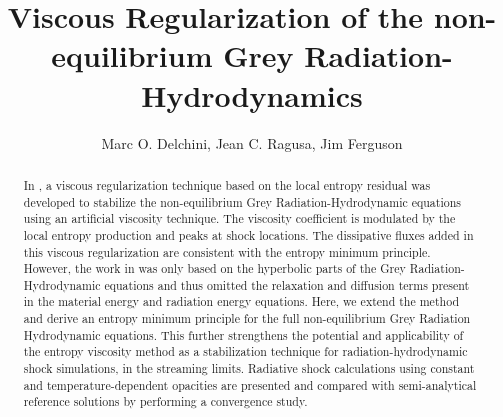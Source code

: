 \documentclass[times,doublespace]{fldauth}%
\begin{document}
%


\title{Viscous Regularization of the non-equilibrium Grey Radiation-Hydrodynamics}

\author{Marc O. Delchini, Jean C. Ragusa\corrauth{}, Jim Ferguson}

\address{
{Department of Nuclear Engineering, Texas A\&M University, College Station, TX 77843, USA} \\
{Los Alamos National Laboratory, Los Alamos, NM 77843, USA}
}


\begin{abstract}
In \cite{our_jcp_radhy_paper}, a viscous regularization technique based on the local entropy residual was
developed to stabilize the non-equilibrium Grey Radiation-Hydrodynamic equations using an artificial viscosity technique. 
The viscosity coefficient is modulated by the local entropy production and peaks at shock locations. 
The dissipative fluxes added in this viscous regularization are consistent with the entropy minimum principle. 
However, the work in \cite{our_jcp_radhy_paper} was only based on the hyperbolic parts
of the Grey Radiation-Hydrodynamic equations and thus omitted the relaxation and diffusion terms 
present in the material energy and radiation energy equations. 
%
Here, we extend the method and derive an entropy minimum principle for the full non-equilibrium Grey Radiation Hydrodynamic 
equations. This further strengthens the potential and applicability of the entropy viscosity method as a stabilization technique 
for radiation-hydrodynamic shock simulations, in  the streaming  limits. 
Radiative shock calculations using constant and temperature-dependent opacities are presented and 
compared with semi-analytical reference solutions by performing a convergence study. %
\end{abstract}
\end{document}
